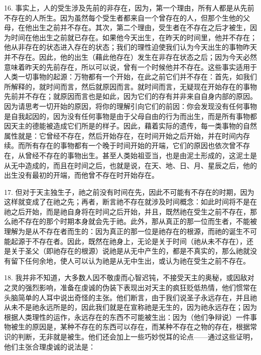16. 事实上，人的受生涉及先前的非存在，因为，第一个理由，所有人都是从先前不存在的人所生。因为虽然每个受生者都来自一个曾存在的人，但那个生他的父母，在他出生之前并不存在。其次，第二个理由，受生者在不存在之后才被生，因为时间在他出生之前就已存在。如果他今天出生，在昨天的时间里，他并不存在；他从非存在的状态进入存在的状态；我们的理性迫使我们认为今天出生的事物昨天并不存在。因此，他的出生（藉此他存在）发生在非存在状态之后；因为今天必然意味着昨天的先前存在，所以可以说，曾有一个时候他并不存在。这些事实适用于人类一切事物的起源：万物都有一个开始，在此之前它们并不存在：首先，如我们所解释的，就时间而言，然后就原因而言。就时间而言，无疑现在开始存在的事物先前并不存在；就原因而言也是如此，因为它们的存有并非来自自身内部的原因。因为请思考一切开始的原因，将你的理解引向它们的前因：你会发现没有任何事物是自我起因的，因为没有任何事物是由于父母自由的行为而出生，而是所有事物都因天主的德能被造成它们所是的样子。因此，藉着实际的遗传，每一类事物的自然属性就是：它曾经不存在，然后开始存在，在时间开始之后开始，并在时间内存续。而所有存在的事物都有一个晚于时间开始的开端，它们的原因也依次曾不存在，从曾经不存在的事物出生。甚至人类始祖亚当，也是由泥土形成的，这泥土是从无中造成的，而且在时间之后，也就是说，在天、地、日、月、星辰之后，他的出生没有最初的开端，而他曾不存在时开始存在。\par

17. 但对于天主独生子，祂之前没有时间在先，因此不可能有不存在的时期，因为这样就变成了在祂之先；再者，断言祂不存在就涉及时间概念：如此时间将不是在祂之后开始，而是祂自身将在时间之后开始，并且，既然祂在受生之前不存在，那么祂不存在的那个时期本身就会先于祂。此外，那从真正的那一位而生者，不能被理解为是从不存在者而生的：因为真正的那一位是祂存在的根源，而祂的诞生不可能起源于不存在者。因此，既然在祂身上，无论是关于时间（祂从未不存在），还是关于圣父（即祂存在的根源）说祂是从无中产生的，都是不真实的，那么祂就没有留下任何余地，使人可以认为祂是从无中生出，或认为祂在受生之前不存在。\par

18. 我并非不知道，大多数人因不敬虔而心智迟钝，不接受天主的奥秘，或因敌对之灵的强烈影响，准备在虔诚的伪装下表现出对天主的疯狂贬低热情，他们惯常在头脑简单的人耳中说出奇怪的主张。他们断言，由于我们说圣子永远存在，并且祂从未不是祂永远所是的，因此我们就是在宣称祂是无生的，因为祂永远存在；因为根据人类理性的运作，永远存在的东西不可能被生出：因为（他们争辩说）一件事物被生的原因是，某种不存在的东西可以存在，而某种不存在之物的存在，根据常识的判断，无非就是被生。他们还会加上一些巧妙悦耳的论点——通过这些证明，他们主张合理虔诚的说法是：\par

